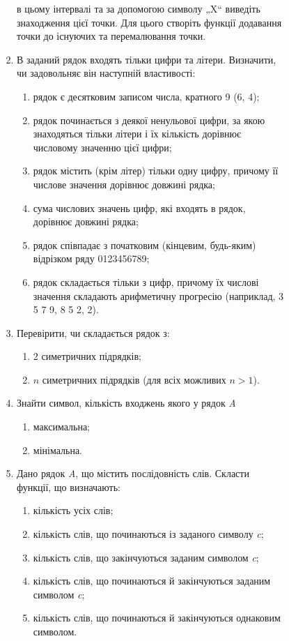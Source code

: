 \documentclass[]{article}
\makeatletter
\newcommand{\xslalph}[1]{\expandafter\@xslalph\csname c@#1\endcsname}
\newcommand{\@xslalph}[1]{%
    \ifcase#1\or а\or б\or в\or г\or д\or e\or є\or ж\or з\or i%
    \or й\or к\or л\or м\or н\or о\or п\or р\or с\or т%
    \or у\or ф\or х\or ц\or ч\or ш\or ю\or я\or аа\or бб\or вв%
    \else\@ctrerr\fi%
}
\makeatother
\begin{document}
\begin{enumerate}
\begin{enumerate}[label=\xslalph*)]
\begin{enumerate}
\begin{enumerate}[label=\xslalph*)]
\begin{enumerate}
в цьому інтервалі та за допомогою символу „X“ виведіть знаходження цієї точки. 
Для цього створіть функції додавання точки до існуючих та перемалювання точки.
\item
  В заданий рядок входять тільки цифри та літери. Визначити, чи
  задовольняє він наступній властивості:
  \begin{enumerate}[label=\xslalph*)]
\item рядок є десятковим записом числа, кратного 9 (6, 4);
\item рядок починається з деякої ненульової цифри, за якою знаходяться
тільки літери і їх кількість дорівнює числовому значенню цієї цифри;
\item рядок містить (крім літер) тільки одну цифру, причому її числове
значення дорівнює довжині рядка;
\item сума числових значень цифр, які входять в рядок, дорівнює довжині
рядка;
\item рядок співпадає з початковим (кінцевим, будь-яким) відрізком ряду
0123456789;
\item рядок складається тільки з цифр, причому їх числові значення
складають арифметичну прогресію (наприклад, 3 5 7 9, 8 5 2, 2).
  \end{enumerate}

\item
  Перевірити, чи складається рядок з:
 \begin{enumerate}[label=\xslalph*)]
 \item 2 симетричних підрядків;
 \item $n$ симетричних підрядків (для всіх можливих $n>1$).
 \end{enumerate}

\item
  Знайти символ, кількість входжень якого у рядок \emph{A}
\begin{enumerate}[label=\xslalph*)]
  \item максимальна;
  \item мінімальна.
\end{enumerate}
\item
Дано рядок \emph{A}, що містить послідовність слів. Скласти функції, що визначають:
\begin{enumerate}[label=\xslalph*)]
\item кількість усіх слів;
\item кількість слів, що починаються із заданого символу \emph{c};
\item кількість слів, що закінчуються заданим символом \emph{c};
\item кількість слів, що починаються й закінчуються заданим символом \emph{c};
\item кількість слів, що починаються й закінчуються однаковим символом.
\end{enumerate}


\end{enumerate}
\end{enumerate}
\end{enumerate}
\end{enumerate}
\end{enumerate}
\end{document}
